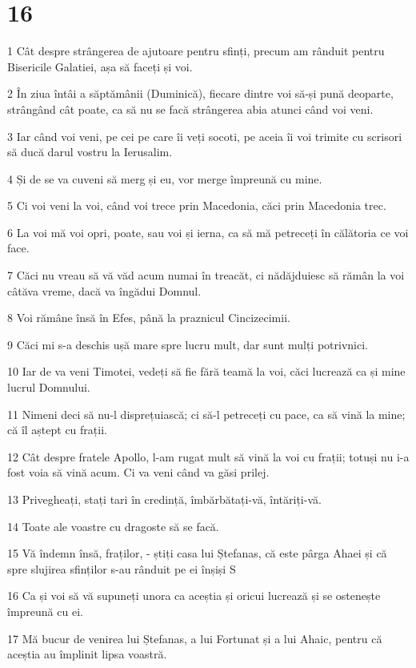 \chapter{16}

\par 1 Cât despre strângerea de ajutoare pentru sfinți, precum am rânduit pentru Bisericile Galatiei, așa să faceți și voi.
\par 2 În ziua întâi a săptămânii (Duminică), fiecare dintre voi să-și pună deoparte, strângând cât poate, ca să nu se facă strângerea abia atunci când voi veni.
\par 3 Iar când voi veni, pe cei pe care îi veți socoti, pe aceia îi voi trimite cu scrisori să ducă darul vostru la Ierusalim.
\par 4 Și de se va cuveni să merg și eu, vor merge împreună cu mine.
\par 5 Ci voi veni la voi, când voi trece prin Macedonia, căci prin Macedonia trec.
\par 6 La voi mă voi opri, poate, sau voi și ierna, ca să mă petreceți în călătoria ce voi face.
\par 7 Căci nu vreau să vă văd acum numai în treacăt, ci nădăjduiesc să rămân la voi câtăva vreme, dacă va îngădui Domnul.
\par 8 Voi rămâne însă în Efes, până la praznicul Cincizecimii.
\par 9 Căci mi s-a deschis ușă mare spre lucru mult, dar sunt mulți potrivnici.
\par 10 Iar de va veni Timotei, vedeți să fie fără teamă la voi, căci lucrează ca și mine lucrul Domnului.
\par 11 Nimeni deci să nu-l disprețuiască; ci să-l petreceți cu pace, ca să vină la mine; că îl aștept cu frații.
\par 12 Cât despre fratele Apollo, l-am rugat mult să vină la voi cu frații; totuși nu i-a fost voia să vină acum. Ci va veni când va găsi prilej.
\par 13 Privegheați, stați tari în credință, îmbărbătați-vă, întăriți-vă.
\par 14 Toate ale voastre cu dragoste să se facă.
\par 15 Vă îndemn însă, fraților, - știți casa lui Ștefanas, că este pârga Ahaei și că spre slujirea sfinților s-au rânduit pe ei înșiși S
\par 16 Ca și voi să vă supuneți unora ca aceștia și oricui lucrează și se ostenește împreună cu ei.
\par 17 Mă bucur de venirea lui Ștefanas, a lui Fortunat și a lui Ahaic, pentru că aceștia au împlinit lipsa voastră.

